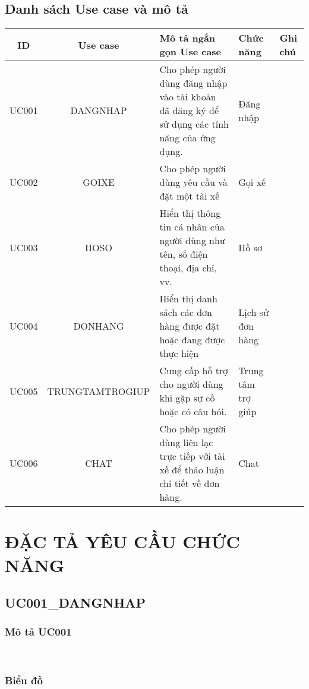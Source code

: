 \documentclass[a4paper,13pt]{report}
\numberwithin{figure}{chapter}
\numberwithin{figure}{section}
\begin{document}
\subsection{Danh sách Use case và mô tả}
\begin{table}[H]
  \centering
  \renewcommand{\arraystretch}{2.5}
  \begin{tabular}{|c|c|p{5cm}|p{3cm}|p{2cm}|}
  \hline
  \textbf{ID} & \textbf{Use case} & \textbf{Mô tả ngắn gọn Use case} & \textbf{Chức năng} & \textbf{Ghi chú} \\
  \hline
  UC001 & DANGNHAP & Cho phép người dùng đăng nhập vào tài khoản đã đăng ký để sử dụng các tính năng của ứng dụng. & Đăng nhập & \\
  \hline
  UC002 & GOIXE & Cho phép người dùng yêu cầu và đặt một tài xế & Gọi xế & \\
  \hline
  UC003 & HOSO & Hiển thị thông tin cá nhân của người dùng như tên, số điện thoại, địa chỉ, vv. & Hồ sơ & \\
  \hline
  UC004 & DONHANG & Hiển thị danh sách các đơn hàng được đặt hoặc đang được thực hiện & Lịch sử đơn hàng & \\
  \hline
  UC005 & TRUNGTAMTROGIUP & Cung cấp hỗ trợ cho người dùng khi gặp sự cố hoặc có câu hỏi. & Trung tâm trợ giúp & \\
  \hline
  UC006 & CHAT & Cho phép người dùng liên lạc trực tiếp với tài xế để thảo luận chi tiết về đơn hàng. & Chat & \\
  \hline
  \end{tabular}
  \end{table}

\section{ĐẶC TẢ YÊU CẦU CHỨC NĂNG}
\subsection{UC001\_DANGNHAP}
\subsubsection{Mô tả UC001}\
\subsubsection{Biểu đồ}
\end{document}

